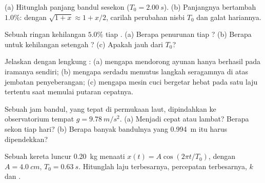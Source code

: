 \begin{exercise}[$\star\star$]\label{exo:g12:oscillators-and-time:9}
(a) Hitunglah panjang bandul sesekon ($T_0 =
\qty{2.00}{s}$). (b) Panjangnya bertambah $1.0\%$: dengan $\sqrt{1+x}
\approx 1 + x/2$, carilah perubahan nisbi $T_0$ dan galat hariannya.
\end{exercise}

\begin{exercise}[$\star\star$]\label{exo:g12:oscillators-and-time:10}
Sebuah   ringan kehilangan $5.0\%$  tiap .
(a) Berapa penurunan  tiap ? (b) Berapa  untuk
kehilangan setengah ? (c) Apakah  jauh dari $T_0$?
\end{exercise}

\begin{exercise}[$\star\star$]\label{exo:g12:oscillators-and-time:11}
Jelaskan dengan lengkung : (a) mengapa mendorong ayunan hanya
berhasil pada iramanya sendiri; (b) mengapa serdadu memutus langkah seragamnya
di atas jembatan penyeberangan; (c) mengapa mesin cuci bergetar hebat pada
satu laju tertentu saat memulai putaran cepatnya.
\end{exercise}

\begin{exercise}[$\star\star\star$]\label{exo:g12:oscillators-and-time:12}
Sebuah jam bandul, yang tepat di permukaan laut, dipindahkan ke observatorium
tempat $g = \qty{9.78}{m/s^2}$. (a) Menjadi cepat atau lambat? Berapa sekon tiap
hari? (b) Berapa banyak bandulnya yang \qty{0.994}{m} itu harus dipendekkan?
\end{exercise}

\begin{exercise}[$\star\star\star$]\label{exo:g12:oscillators-and-time:13}
Sebuah kereta luncur \qty{0.20}{kg} menaati $x(t) = A\cos(2\pi t/T_0)$, dengan $A =
\qty{4.0}{cm}$, $T_0 = \qty{0.63}{s}$. Hitunglah laju terbesarnya,
percepatan terbesarnya,  $k$ dan .
\end{exercise}

